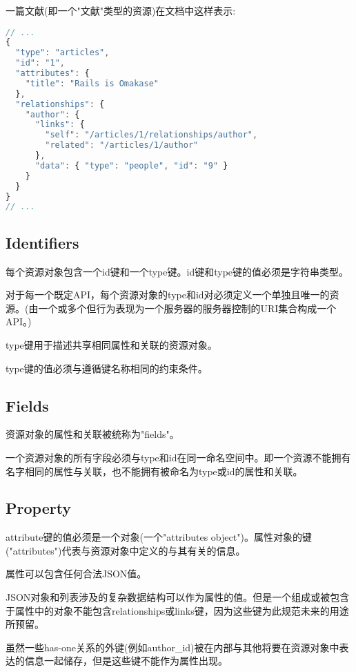 一篇文献(即一个"文献"类型的资源)在文档中这样表示:



\begin{lstlisting}[language=JavaScript]
// ...
{
  "type": "articles",
  "id": "1",
  "attributes": {
    "title": "Rails is Omakase"
  },
  "relationships": {
    "author": {
      "links": {
        "self": "/articles/1/relationships/author",
        "related": "/articles/1/author"
      },
      "data": { "type": "people", "id": "9" }
    }
  }
}
// ...
\end{lstlisting}


\subsection{Identifiers}

每个资源对象包含一个id键和一个type键。id键和type键的值必须是字符串类型。

对于每一个既定API，每个资源对象的type和id对必须定义一个单独且唯一的资源。(由一个或多个但行为表现为一个服务器的服务器控制的URI集合构成一个API。)

type键用于描述共享相同属性和关联的资源对象。

type键的值必须与遵循键名称相同的约束条件。

\subsection{Fields}


资源对象的属性和关联被统称为"fields"。

一个资源对象的所有字段必须与type和id在同一命名空间中。即一个资源不能拥有名字相同的属性与关联，也不能拥有被命名为type或id的属性和关联。


\subsection{Property}

attribute键的值必须是一个对象(一个"attributes object")。属性对象的键("attributes")代表与资源对象中定义的与其有关的信息。

属性可以包含任何合法JSON值。

JSON对象和列表涉及的复杂数据结构可以作为属性的值。但是一个组成或被包含于属性中的对象不能包含relationships或links键，因为这些键为此规范未来的用途所预留。

虽然一些has-one关系的外键(例如author_id)被在内部与其他将要在资源对象中表达的信息一起储存，但是这些键不能作为属性出现。

